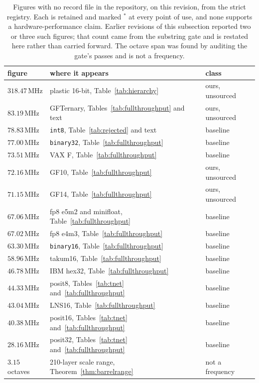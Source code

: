 \begin{table}[t]\centering
\caption{Figures with no record file in the repository, on this revision, from the
strict registry. Each is retained and marked $^{\ast}$ at every point of use, and
none supports a hardware-performance claim. Earlier revisions of this subsection
reported two or three such figures; that count came from the substring gate and is
restated here rather than carried forward. The octave span was found by auditing
the gate's passes and is not a frequency.}
\label{tab:untraced}
\begin{tabular}{lll}
\toprule
figure & where it appears & class \\
\midrule
$318.47$\,MHz & plastic 16-bit, Table~\ref{tab:hierarchy} & ours, unsourced \\
$83.19$\,MHz & GFTernary, Tables~\ref{tab:fullthroughput} and text & ours, unsourced \\
$78.83$\,MHz & \texttt{int8}, Table~\ref{tab:rejected} and text & baseline \\
$77.00$\,MHz & \texttt{binary32}, Table~\ref{tab:fullthroughput} & baseline \\
$73.51$\,MHz & VAX F, Table~\ref{tab:fullthroughput} & baseline \\
$72.16$\,MHz & GF10, Table~\ref{tab:fullthroughput} & ours, unsourced \\
$71.15$\,MHz & GF14, Table~\ref{tab:fullthroughput} & ours, unsourced \\
$67.06$\,MHz & fp8 e5m2 and minifloat, Table~\ref{tab:fullthroughput} & baseline \\
$67.02$\,MHz & fp8 e4m3, Table~\ref{tab:fullthroughput} & baseline \\
$63.30$\,MHz & \texttt{binary16}, Table~\ref{tab:fullthroughput} & baseline \\
$58.96$\,MHz & takum16, Table~\ref{tab:fullthroughput} & baseline \\
$46.78$\,MHz & IBM hex32, Table~\ref{tab:fullthroughput} & baseline \\
$44.33$\,MHz & posit8, Tables~\ref{tab:tnet} and~\ref{tab:fullthroughput} & baseline \\
$43.04$\,MHz & LNS16, Table~\ref{tab:fullthroughput} & baseline \\
$40.38$\,MHz & posit16, Tables~\ref{tab:tnet} and~\ref{tab:fullthroughput} & baseline \\
$28.16$\,MHz & posit32, Tables~\ref{tab:tnet} and~\ref{tab:fullthroughput} & baseline \\
\addlinespace
$3.15$ octaves & 210-layer scale range, Theorem~\ref{thm:barrelrange} & not a frequency \\
\bottomrule
\end{tabular}
\end{table}

